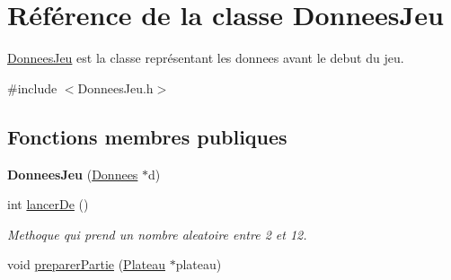 \hypertarget{classDonneesJeu}{\section{\-Référence de la classe \-Donnees\-Jeu}
\label{classDonneesJeu}
}


\hyperlink{classDonneesJeu}{\-Donnees\-Jeu} est la classe représentant les donnees avant le debut du jeu.  




{\ttfamily \#include $<$\-Donnees\-Jeu.\-h$>$}

\subsection*{\-Fonctions membres publiques}
\begin{DoxyCompactItemize}
\item 
\hypertarget{classDonneesJeu_a8481b1b72ec382f7c5b34d564bd6a39c}{{\bfseries \-Donnees\-Jeu} (\hyperlink{classDonnees}{\-Donnees} $\ast$d)}\label{classDonneesJeu_a8481b1b72ec382f7c5b34d564bd6a39c}

\item 
int \hyperlink{classDonneesJeu_a39169eecf0e197ccf5677c7a1602a172}{lancer\-De} ()
\begin{DoxyCompactList}\small\item\em \-Methoque qui prend un nombre aleatoire entre 2 et 12. \end{DoxyCompactList}\item 
\hypertarget{classDonneesJeu_aa8f22aa69faeb3e54d76a5aaa3d4444f}{void \hyperlink{classDonneesJeu_aa8f22aa69faeb3e54d76a5aaa3d4444f}{preparer\-Partie} (\hyperlink{classPlateau}{\-Plateau} $\ast$plateau)}\label{classDonneesJeu_aa8f22aa69faeb3e54d76a5aaa3d4444f}


\end{DoxyCompactItemize}
